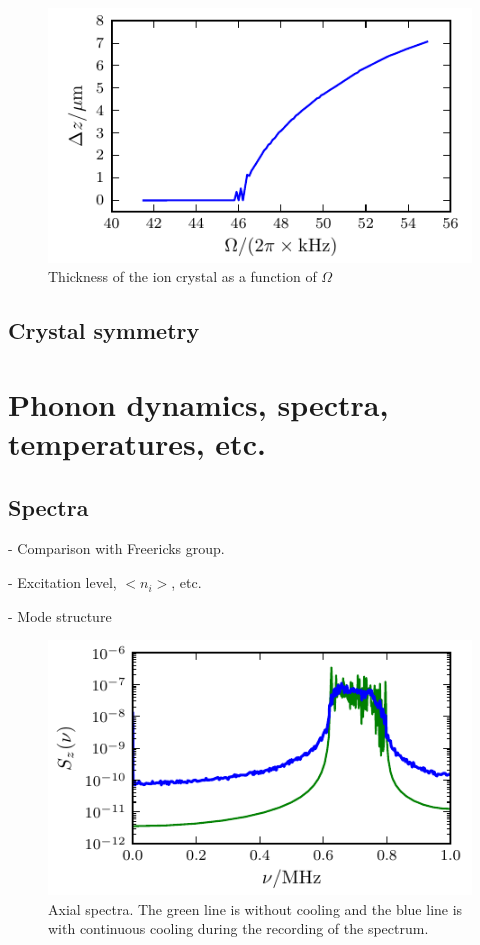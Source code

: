 \documentclass[
  aps,
  reprint,
  twoside,
  showpacs,
  amsmath,
  amssymb,
  floatfix
]{revtex4-1}
\begin{document}
\begin{figure}
\center\includegraphics{./figures/thicknessVsOmega.pdf}
\caption{Thickness of the ion crystal as a function of $\Omega$}
\label{fig:ThicknessVsOmega}
\end{figure}

\subsection{Crystal symmetry}


\section{Phonon dynamics, spectra, temperatures, etc.}
\label{sec:dynamics}

\subsection{Spectra}

- Comparison with Freericks group.

- Excitation level, $<n_i>$, etc.

- Mode structure

\begin{figure}
\center\includegraphics{./figures/axialSpectra}
\caption{Axial spectra.  The green line is without cooling and the blue
  line is with continuous cooling during the recording of the spectrum.}
  \label{fig:axialSpectra}
\end{figure}
\end{document}
